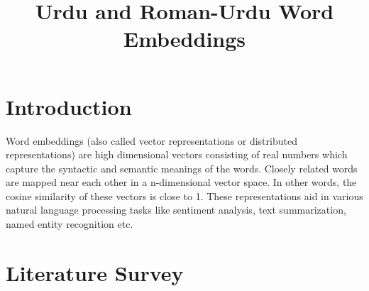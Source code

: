\documentclass[format=acmsmall,review=true,screen=true]{acmart}
\begin{document}
    \title{Urdu and Roman-Urdu Word Embeddings}
    
    \section{Introduction}
Word embeddings (also called vector representations or distributed representations) are high dimensional vectors consisting of real numbers which capture the syntactic and semantic meanings of the words. Closely related words are mapped near each other in a n-dimensional vector space. In other words, the cosine similarity of these vectors is close to 1. These representations aid in various natural language processing tasks like sentiment analysis, text summarization, named entity recognition etc.\\

    \section{Literature Survey}
    
\end{document}
